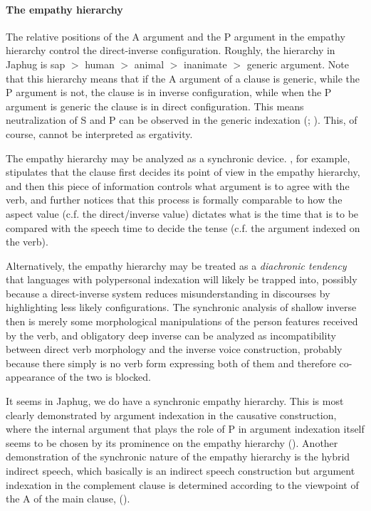 \documentclass[a4paper, oneside, 12pt]{report}
\newcommand*{\textgt}{$>$ }
\newcommand*{\citesec}[1]{\S~{#1}}
\begin{document}
\paragraph*{The empathy hierarchy}\label{sec:grammatical.clause.direct-inverse.hierarchy} 
The relative positions of the A argument and the P argument in the empathy hierarchy
control the direct-inverse configuration.
Roughly, the hierarchy in Japhug is 
\ac{sap} \textgt human \textgt animal \textgt inanimate \textgt generic argument.
Note that this hierarchy means that
if the A argument of a clause is generic,
while the P argument is not,
the clause is in inverse configuration,
while when the P argument is generic the clause is in direct configuration.
This means neutralization of S and P can be observed in the generic indexation
(\citealt{jacques2012argument}; \citealt[\citesec{14.3.2.5}]{jacques2021grammar}).
This, of course, cannot be interpreted as ergativity.

The empathy hierarchy may be analyzed as a synchronic device. 
\citet[\citesec{7.4}]{wiltschko2014universal}, for example,
stipulates that the clause first decides its point of view in the empathy hierarchy,
and then this piece of information controls what argument is to agree with the verb,
and further notices that this process is formally comparable to
how the aspect value (c.f. the direct/inverse value) 
dictates what is the time that is to be compared with the speech time to decide the tense
(c.f. the argument indexed on the verb).

Alternatively, the empathy hierarchy may be treated as a \emph{diachronic tendency}
that languages with polypersonal indexation will likely be trapped into,
possibly because a direct-inverse system reduces misunderstanding in discourses
by highlighting less likely configurations.
The synchronic analysis of shallow inverse then is merely 
some morphological manipulations of the person features received by the verb,
and obligatory deep inverse can be analyzed as incompatibility between
direct verb morphology and the inverse voice construction,
probably because there simply is no verb form expressing both of them
and therefore co-appearance of the two is blocked.

It seems in Japhug, we do have a synchronic empathy hierarchy.
This is most clearly demonstrated by argument indexation in the causative construction,
where the internal argument that plays the role of P in argument indexation
itself seems to be chosen by its prominence on the empathy hierarchy
().
Another demonstration of the synchronic nature of the empathy hierarchy
is the hybrid indirect speech,
which basically is an indirect speech construction
but argument indexation in the complement clause is determined
according to the viewpoint of the A of the main clause,
().
\end{document}
